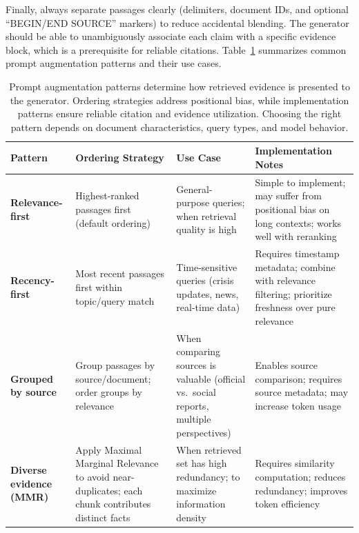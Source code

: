 Finally, always separate passages clearly (delimiters, document IDs, and optional ``BEGIN/END SOURCE'' markers) to reduce accidental blending. The generator should be able to unambiguously associate each claim with a specific evidence block, which is a prerequisite for reliable citations. Table~\ref{tab:ch08_prompt_patterns} summarizes common prompt augmentation patterns and their use cases.

\begin{table}[tb]
\centering
\small
\caption{Prompt augmentation patterns determine how retrieved evidence is presented to the generator. Ordering strategies address positional bias, while implementation patterns ensure reliable citation and evidence utilization. Choosing the right pattern depends on document characteristics, query types, and model behavior.}
\label{tab:ch08_prompt_patterns}
\setlength{\tabcolsep}{6pt}
\renewcommand{\arraystretch}{1.3}
\begin{tabularx}{\linewidth}{@{}>{\raggedright\arraybackslash}p{3cm}>{\raggedright\arraybackslash}X>{\raggedright\arraybackslash}X>{\raggedright\arraybackslash}X@{}}
\toprule
\rowcolor{gray!15}
\textbf{Pattern} & \textbf{Ordering Strategy} & \textbf{Use Case} & \textbf{Implementation Notes} \\
\midrule
\textbf{Relevance-first} & Highest-ranked passages first (default ordering) & General-purpose queries; when retrieval quality is high & Simple to implement; may suffer from positional bias on long contexts; works well with reranking \\
\addlinespace[1pt]
\textbf{Recency-first} & Most recent passages first within topic/query match & Time-sensitive queries (crisis updates, news, real-time data) & Requires timestamp metadata; combine with relevance filtering; prioritize freshness over pure relevance \\
\addlinespace[1pt]
\textbf{Grouped by source} & Group passages by source/document; order groups by relevance & When comparing sources is valuable (official vs.\ social reports, multiple perspectives) & Enables source comparison; requires source metadata; may increase token usage \\
\addlinespace[1pt]
\textbf{Diverse evidence (MMR)} & Apply Maximal Marginal Relevance to avoid near-duplicates; each chunk contributes distinct facts & When retrieved set has high redundancy; to maximize information density & Requires similarity computation; reduces redundancy; improves token efficiency \\

\end{tabularx}
\end{table}
